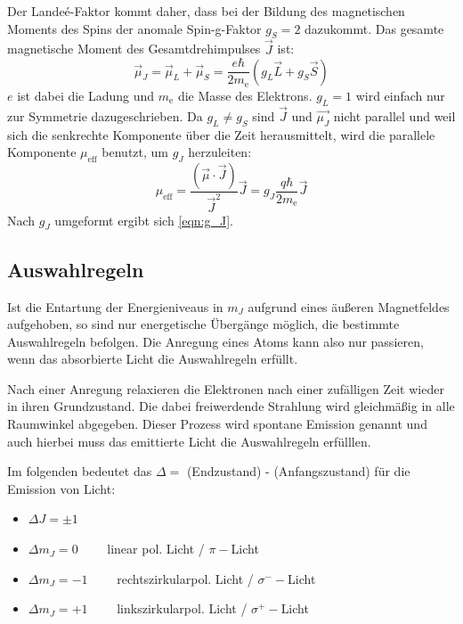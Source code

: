             Der Landeé-Faktor kommt daher, dass bei der Bildung des magnetischen Moments des Spins der anomale Spin-g-Faktor $g_S = 2$ dazukommt.
            Das gesamte magnetische Moment des Gesamtdrehimpulses $\vec{J}$ ist:
            \begin{equation}
                \vec{\mu}_J = \vec{\mu}_L + \vec{\mu}_S = \frac{e \hbar}{2m_{\text{e}}} \left(g_L \vec{L} + g_S \vec{S}\right)
            \end{equation}
            $e$ ist dabei die Ladung und $m_\text{e}$ die Masse des Elektrons. $g_L = 1$ wird einfach nur zur Symmetrie dazugeschrieben.
            Da $g_L \neq g_S$ sind $\vec{J}$ und $\vec{\mu_J}$ nicht parallel und weil sich die senkrechte Komponente über die Zeit herausmittelt, wird die parallele Komponente $\mu_{\text{eff}}$ benutzt, um $g_J$ herzuleiten:
            \begin{equation}
                \mu_{\text{eff}} = \frac{(\vec{\mu} \cdot \vec{J})}{\vec{J}^2} \vec{J} = g_J \frac{q \hbar}{2m_{\text{e}}} \vec{J}
            \end{equation}
            Nach $g_J$ umgeformt ergibt sich \eqref{eqn:g_J}.


    \subsection{Auswahlregeln}
    \label{sec:auswahlregeln}
        Ist die Entartung der Energieniveaus in $m_J$ aufgrund eines äußeren Magnetfeldes aufgehoben, so sind nur energetische Übergänge möglich, die bestimmte Auswahlregeln befolgen.
        Die Anregung eines Atoms kann also nur passieren, wenn das absorbierte Licht die Auswahlregeln erfüllt.

        Nach einer Anregung relaxieren die Elektronen nach einer zufälligen Zeit wieder in ihren Grundzustand.
        Die dabei freiwerdende Strahlung wird gleichmäßig in alle Raumwinkel abgegeben.
        Dieser Prozess wird spontane Emission genannt und auch hierbei muss das emittierte Licht die Auswahlregeln erfülllen.

        Im folgenden bedeutet das $\Delta = $ (Endzustand) - (Anfangszustand) für die Emission von Licht:
        \begin{itemize}
            \item $\Delta J = \pm 1$
            \item $\Delta m_J = 0 \qquad$ linear pol. Licht / $\pi -$Licht
            \item $\Delta m_J = -1 \qquad$ rechtszirkularpol. Licht / $\sigma^- -$Licht
            \item $\Delta m_J = +1 \qquad$ linkszirkularpol. Licht / $\sigma^+ -$Licht
        \end{itemize}

